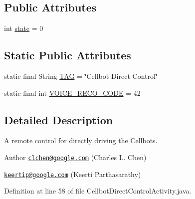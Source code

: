 \subsection*{Public Attributes}
\begin{DoxyCompactItemize}
\item 
int \hyperlink{classcom_1_1cellbots_1_1directcontrol_1_1_cellbot_direct_control_activity_a502f929bb77188d373e69557ca1dc390}{state} = 0
\end{DoxyCompactItemize}
\subsection*{Static Public Attributes}
\begin{DoxyCompactItemize}
\item 
static final String \hyperlink{classcom_1_1cellbots_1_1directcontrol_1_1_cellbot_direct_control_activity_a6992276f903a32207161d88ddb246ee5}{T\-A\-G} = \char`\"{}Cellbot Direct Control\char`\"{}
\item 
static final int \hyperlink{classcom_1_1cellbots_1_1directcontrol_1_1_cellbot_direct_control_activity_aeb0921f8654a5567dcbab2e5d15c3893}{V\-O\-I\-C\-E\-\_\-\-R\-E\-C\-O\-\_\-\-C\-O\-D\-E} = 42
\end{DoxyCompactItemize}


\subsection{Detailed Description}
A remote control for directly driving the Cellbots.

\begin{DoxyAuthor}{Author}
\href{mailto:clchen@google.com}{\tt clchen@google.\-com} (Charles L. Chen) 

\href{mailto:keertip@google.com}{\tt keertip@google.\-com} (Keerti Parthasarathy) 
\end{DoxyAuthor}


Definition at line 58 of file Cellbot\-Direct\-Control\-Activity.\-java.



